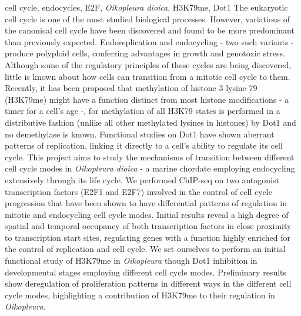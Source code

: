 \documentclass[11pt,twoside,a4paper]{report}
\begin{document}

\TitlePage
    \vspace*{55mm}
        {cell cycle, endocycles, E2F, \textit{Oikopleura dioica}, H3K79me, Dot1}
		{The eukaryotic cell cycle is one of the most studied biological processes. However, variations of the canonical cell cycle have been discovered and found to be more predominant than previously expected. Endoreplication and endocycling - two such variants - produce polyploid cells, conferring advantages in growth and genotoxic stress. Although some of the regulatory principles of these cycles are being discovered, little is known about how cells can transition from a mitotic cell cycle to them.
		Recently, it has been proposed that methylation of histone 3 lysine 79 (H3K79me) might have a function distinct from most histone modifications - a timer for a cell's age -, for methylation of all H3K79 states is performed in a distributive fashion (unlike all other methylated lysines in histones) by Dot1 and no demethylase is known. Functional studies on Dot1 have shown aberrant patterns of replication, linking it directly to a cell's ability to regulate its cell cycle.
		This project aims to study the mechanisms of transition between different cell cycle modes in \textit{Oikopleura dioica} - a marine chordate employing endocycling extensively through its life cycle.
		We performed ChIP-seq on two antagonist transcription factors (E2F1 and E2F7) involved in the control of cell cycle progression that have been shown to have differential patterns of regulation in mitotic and endocycling cell cycle modes. Initial results reveal a high degree of spatial and temporal occupancy of both transcription factors in close proximity to transcription start sites, regulating genes with a function highly enriched for the control of replication and cell cycle. We set ourselves to perform an initial functional study of H3K79me in \textit{Oikopleura} though Dot1 inhibition in developmental stages employing different cell cycle modes. Preliminary results show deregulation of proliferation patterns in different ways in the different cell cycle modes, highlighting a contribution of H3K79me to their regulation in \textit{Oikopleura}.
		}
\EndTitlePage

\cleardoublepage

\end{document}

